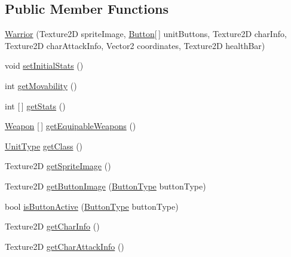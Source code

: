 \subsection*{Public Member Functions}
\begin{DoxyCompactItemize}
\item 
\hyperlink{class_model_1_1_unit_module_1_1_warrior_ade02c516e012f06440b011ea0b62dbc4}{Warrior} (Texture2D sprite\+Image, \hyperlink{class_model_1_1_button}{Button}\mbox{[}$\,$\mbox{]} unit\+Buttons, Texture2D char\+Info, Texture2D char\+Attack\+Info, Vector2 coordinates, Texture2D health\+Bar)
\item 
void \hyperlink{class_model_1_1_unit_module_1_1_warrior_a3a55c013bad5ebd5f6e4402fc8b1f887}{set\+Initial\+Stats} ()
\item 
int \hyperlink{class_model_1_1_unit_module_1_1_warrior_a2c9d4bae73598731bd6378add6a377e7}{get\+Movability} ()
\item 
int \mbox{[}$\,$\mbox{]} \hyperlink{class_model_1_1_unit_module_1_1_warrior_ad058a6586b28d7d23075e557a99712aa}{get\+Stats} ()
\item 
\hyperlink{interface_model_1_1_weapon_module_1_1_weapon}{Weapon} \mbox{[}$\,$\mbox{]} \hyperlink{class_model_1_1_unit_module_1_1_warrior_a881ad4fa5437c4353abd62a56d0ab37d}{get\+Equipable\+Weapons} ()
\item 
\hyperlink{namespace_model_1_1_unit_module_aba9769f408747bf38d0d8adca8f68c98}{Unit\+Type} \hyperlink{class_model_1_1_unit_module_1_1_warrior_ad075c71e62a88cc0cd5f93c9600ac952}{get\+Class} ()
\item 
Texture2D \hyperlink{class_model_1_1_unit_module_1_1_warrior_afb4b568eb1d84ec9adca68e8ca8c79b4}{get\+Sprite\+Image} ()
\item 
Texture2D \hyperlink{class_model_1_1_unit_module_1_1_warrior_a57f0ec7afa2f99e178b63fa0e4f455d5}{get\+Button\+Image} (\hyperlink{namespace_model_ac76b3489c9d704f49912608bd36cd0e7}{Button\+Type} button\+Type)
\item 
bool \hyperlink{class_model_1_1_unit_module_1_1_warrior_a6727d75c6005f0d8e72d64ad302e4fec}{is\+Button\+Active} (\hyperlink{namespace_model_ac76b3489c9d704f49912608bd36cd0e7}{Button\+Type} button\+Type)
\item 
Texture2D \hyperlink{class_model_1_1_unit_module_1_1_warrior_a4b5e10506a23aff7acb02896e4762da7}{get\+Char\+Info} ()
\item 
Texture2D \hyperlink{class_model_1_1_unit_module_1_1_warrior_a6774680a84b9fea3ac5e95f0fc8ad9a7}{get\+Char\+Attack\+Info} ()
\item 

\end{DoxyCompactItemize}
